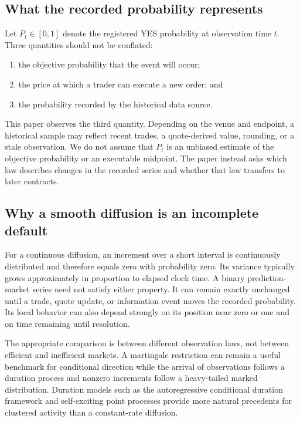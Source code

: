 \documentclass[11pt]{article}
\begin{document}
\subsection{What the recorded probability represents}

Let $P_t\in[0,1]$ denote the registered YES probability at observation time $t$. Three quantities
should not be conflated:
\begin{enumerate}
  \item the objective probability that the event will occur;
  \item the price at which a trader can execute a new order; and
  \item the probability recorded by the historical data source.
\end{enumerate}
This paper observes the third quantity. Depending on the venue and endpoint, a historical sample
may reflect recent trades, a quote-derived value, rounding, or a stale observation. We do not
assume that $P_t$ is an unbiased estimate of the objective probability or an executable midpoint.
The paper instead asks which law describes changes in the recorded series and whether that law
transfers to later contracts.

\subsection{Why a smooth diffusion is an incomplete default}

For a continuous diffusion, an increment over a short interval is continuously distributed and
therefore equals zero with probability zero. Its variance typically grows approximately in
proportion to elapsed clock time. A binary prediction-market series need not satisfy either
property. It can remain exactly unchanged until a trade, quote update, or information event moves
the recorded probability. Its local behavior can also depend strongly on its position near zero
or one and on time remaining until resolution.

The appropriate comparison is between different observation laws, not between efficient and
inefficient markets. A martingale restriction can remain a useful benchmark for conditional
direction while the arrival of observations follows a duration process and nonzero increments
follow a heavy-tailed marked distribution. Duration models such as the autoregressive conditional
duration framework \cite{engle1998} and self-exciting point processes
\cite{hawkes1971,bacry2013} provide more natural precedents for clustered activity than a
constant-rate diffusion.
\end{document}
